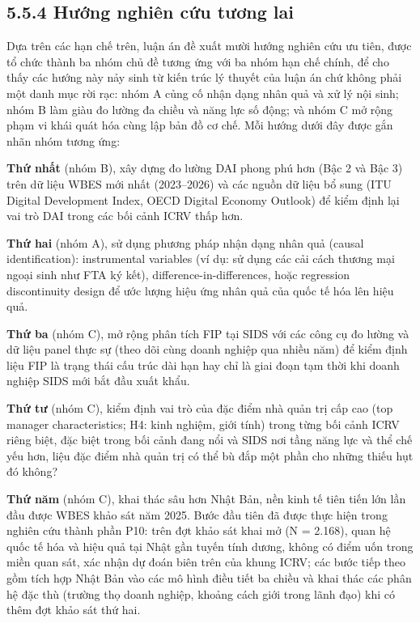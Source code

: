 \documentclass[
  a4paper,
  13pt]{extreport}
\begin{document}
\hypertarget{hux1b0ux1edbng-nghiuxean-cux1ee9u-tux1b0ux1a1ng-lai}{%
\subsection{5.5.4 Hướng nghiên cứu tương
lai}\label{hux1b0ux1edbng-nghiuxean-cux1ee9u-tux1b0ux1a1ng-lai}}

Dựa trên các hạn chế trên, luận án đề xuất mười hướng nghiên cứu ưu
tiên, được tổ chức thành ba nhóm chủ đề tương ứng với ba nhóm hạn chế
chính, để cho thấy các hướng này nảy sinh từ kiến trúc lý thuyết của
luận án chứ không phải một danh mục rời rạc: nhóm A củng cố nhận dạng
nhân quả và xử lý nội sinh; nhóm B làm giàu đo lường đa chiều và năng
lực số động; và nhóm C mở rộng phạm vi khái quát hóa cùng lập bản đồ cơ
chế. Mỗi hướng dưới đây được gắn nhãn nhóm tương ứng:

\textbf{Thứ nhất} (nhóm B), xây dựng đo lường DAI phong phú hơn (Bậc 2
và Bậc 3) trên dữ liệu WBES mới nhất (2023--2026) và các nguồn dữ liệu
bổ sung (ITU Digital Development Index, OECD Digital Economy Outlook) để
kiểm định lại vai trò DAI trong các bối cảnh ICRV thấp hơn.

\textbf{Thứ hai} (nhóm A), sử dụng phương pháp nhận dạng nhân quả
(causal identification): instrumental variables (ví dụ: sử dụng các cải
cách thương mại ngoại sinh như FTA ký kết), difference-in-differences,
hoặc regression discontinuity design để ước lượng hiệu ứng nhân quả của
quốc tế hóa lên hiệu quả.

\textbf{Thứ ba} (nhóm C), mở rộng phân tích FIP tại SIDS với các công cụ
đo lường và dữ liệu panel thực sự (theo dõi cùng doanh nghiệp qua nhiều
năm) để kiểm định liệu FIP là trạng thái cấu trúc dài hạn hay chỉ là
giai đoạn tạm thời khi doanh nghiệp SIDS mới bắt đầu xuất khẩu.

\textbf{Thứ tư} (nhóm C), kiểm định vai trò của đặc điểm nhà quản trị
cấp cao (top manager characteristics; H4: kinh nghiệm, giới tính) trong
từng bối cảnh ICRV riêng biệt, đặc biệt trong bối cảnh đang nổi và SIDS
nơi tầng năng lực và thể chế yếu hơn, liệu đặc điểm nhà quản trị có thể
bù đắp một phần cho những thiếu hụt đó không?

\textbf{Thứ năm} (nhóm C), khai thác sâu hơn Nhật Bản, nền kinh tế tiên
tiến lớn lần đầu được WBES khảo sát năm 2025. Bước đầu tiên đã được thực
hiện trong nghiên cứu thành phần P10: trên đợt khảo sát khai mở (N =
2.168), quan hệ quốc tế hóa và hiệu quả tại Nhật gần tuyến tính dương,
không có điểm uốn trong miền quan sát, xác nhận dự đoán biên trên của
khung ICRV; các bước tiếp theo gồm tích hợp Nhật Bản vào các mô hình
điều tiết ba chiều và khai thác các phân hệ đặc thù (trường thọ doanh
nghiệp, khoảng cách giới trong lãnh đạo) khi có thêm đợt khảo sát thứ
hai.
\end{document}
